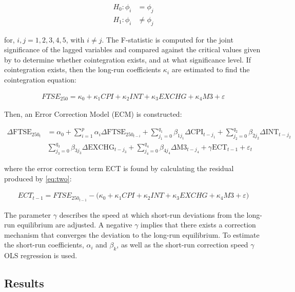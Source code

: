 \documentclass[11pt,a4paper]{article}
\newcommand{\citeboth}[1]{\citeauthor{#1} \citep{#1}}
\begin{document}
\begin{align*}
    H_{0}: \phi_i &= \phi_j\\
    H_{1}: \phi_i &\neq \phi_j
\end{align*}

for, $i,j = 1,2,3,4,5$, with $i\neq j$. The F-statistic is computed for the joint
significance of the lagged variables and compared against the critical values
given by \citeboth{pesaran2001} to determine whether cointegration exists, 
and at what significance level. If cointegration exists, then 
the long-run coefficients $\kappa_i$ are estimated to find the cointegration equation:

\begin{align}
    FTSE_{250} = \kappa_0 + \kappa_1 CPI + \kappa_2 INT + \kappa_3 EXCHG + \kappa_4 M3 + \varepsilon \label{eq:two}
\end{align}

Then, an Error Correction Model (ECM) is constructed:

\begin{align*}
    \Delta \text{FTSE}_{250_t} &= \alpha_0 + \sum_{i=1}^{p} \alpha_i \Delta \text{FTSE}_{250_{t-i}} + \sum_{j_{1}=0}^{q_1} \beta_{1j_{1}} \Delta \text{CPI}_{t-j_{1}} + \sum_{j_{2}=0}^{q_2} \beta_{2j_{2}} \Delta \text{INT}_{t-j_{2}} \\
                               & \sum_{j_{3}=0}^{q_3} \beta_{3j_{3}} \Delta \text{EXCHG}_{t-j_{3}} + \sum_{j_{4}=0}^{q_4} \beta_{4j_{4}} \Delta \text{M3}_{t-j_{4}} + \gamma\text{ECT}_{t-1} + \varepsilon_t
\end{align*}

where the error correction term ECT is found by calculating the residual 
produced by \eqref{eq:two}:

\begin{align*}
    ECT_{t-1} = FTSE_{250_{t-1}} - \biggl(\kappa_0 + \kappa_1 CPI + \kappa_2 INT + \kappa_3 EXCHG + \kappa_4 M3 + \varepsilon \biggr)
\end{align*}

The parameter $\gamma$ describes the speed at which short-run deviations from the long-run equilibrium
are adjusted. A negative $\gamma$ implies that there exists a correction mechanism that converges the deviation 
to the long-run equilibrium. To estimate the short-run coefficients, $\alpha_i$ and $\beta_k$, as 
well as the short-run correction speed $\gamma$ OLS regression is used.

\subsection{Results}
\end{document}
